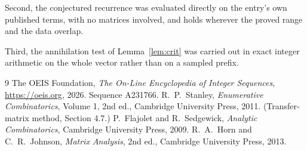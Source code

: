 \documentclass[11pt,a4paper]{article}
\theoremstyle{plain}
\theoremstyle{definition}
\begin{document}
Second, the conjectured recurrence was evaluated directly on the entry's own published terms,
with no matrices involved, and holds wherever the proved range and the data overlap.

Third, the annihilation test of Lemma~\ref{lem:crit} was carried out in exact integer
arithmetic on the whole vector rather than on a sampled prefix.

\begin{thebibliography}{9}
 The OEIS Foundation, \emph{The On-Line Encyclopedia of Integer
Sequences}, \url{https://oeis.org}, 2026. Sequence A231766.
 R.~P.~Stanley, \emph{Enumerative Combinatorics}, Volume 1, 2nd ed.,
Cambridge University Press, 2011. (Transfer-matrix method, Section 4.7.)
 P.~Flajolet and R.~Sedgewick, \emph{Analytic Combinatorics}, Cambridge
University Press, 2009.
 R.~A.~Horn and C.~R.~Johnson, \emph{Matrix Analysis}, 2nd ed., Cambridge
University Press, 2013.
\end{thebibliography}
\end{document}
